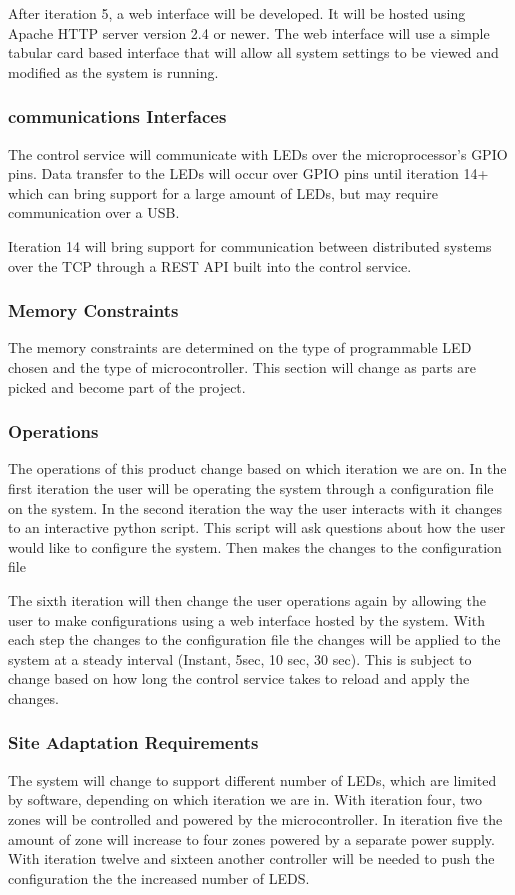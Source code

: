\documentclass[onecolumn, draftclsnofoot,10pt, compsoc]{IEEEtran}
\begin{document}
						After iteration 5, a web interface will be developed. It will be hosted using Apache HTTP server version 2.4 or newer. The web interface will use a simple tabular card based interface
						that will allow all system settings to be viewed and modified as the system is running.

						\subsubsection{communications Interfaces}
						The control service will communicate with LEDs over the microprocessor's GPIO pins. Data transfer to the LEDs will occur over GPIO pins until iteration 14+ which can bring support for a
						large amount of LEDs, but may require communication over a USB.

						Iteration 14 will bring support for communication between distributed systems over the TCP through a REST API built into the control service.
						\subsubsection{Memory Constraints}
						The memory constraints are determined on the type of programmable LED chosen and the type of microcontroller. This section will change as parts are picked and become part of the project.

					\subsubsection{Operations}

					The operations of this product change based on which iteration we are on. In the first iteration the user will be operating the system through a configuration file on the system. In the second iteration
					the way the user interacts with it changes to an interactive python script. This script will ask questions about how the user would like to configure the system. Then makes the changes to the configuration file

					The sixth iteration will then change the user operations again by allowing the user to make configurations using a web interface hosted by the system. With each step the changes to the configuration file the
					changes will be applied to the system at a steady interval (Instant, 5sec, 10 sec, 30 sec). This is subject to change based on how long the control service takes to reload and apply the changes.
					\subsubsection{Site Adaptation Requirements}
					The system will change to support different number of LEDs, which are limited by software, depending on which iteration we are in. With iteration four, two zones will be controlled and powered by the microcontroller.
					In iteration five the amount of zone will increase to four zones powered by a separate power supply. With iteration twelve and sixteen another controller will be needed to push the configuration the the increased number
					of LEDS.
\end{document}
